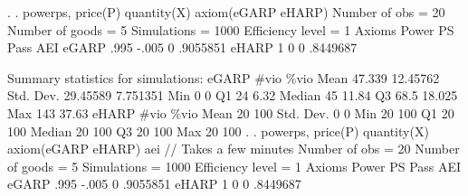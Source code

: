 . 
. powerps, price(P) quantity(X) axiom(eGARP eHARP)
{\smallskip}
                       Number of obs           =        20 
                       Number of goods         =         5 
                       Simulations             =      1000 
                       Efficiency level        =         1 
{\smallskip}
      Axioms {\VBAR}     Power         PS       Pass        AEI 
       eGARP {\VBAR}      .995      -.005          0   .9055851 
       eHARP {\VBAR}         1          0          0   .8449687 
 
Summary statistics for simulations:
{\smallskip}
       eGARP {\VBAR}      \#vio       \%vio 
        Mean {\VBAR}    47.339   12.45762 
   Std. Dev. {\VBAR}  29.45589   7.751351 
         Min {\VBAR}         0          0 
          Q1 {\VBAR}        24       6.32 
      Median {\VBAR}        45      11.84 
          Q3 {\VBAR}      68.5     18.025 
         Max {\VBAR}       143      37.63 
{\smallskip}
       eHARP {\VBAR}      \#vio       \%vio 
        Mean {\VBAR}        20        100 
   Std. Dev. {\VBAR}         0          0 
         Min {\VBAR}        20        100 
          Q1 {\VBAR}        20        100 
      Median {\VBAR}        20        100 
          Q3 {\VBAR}        20        100 
         Max {\VBAR}        20        100 
{\smallskip}
. 
. powerps, price(P) quantity(X) axiom(eGARP eHARP) aei    // Takes a few minutes
{\smallskip}
                       Number of obs           =        20 
                       Number of goods         =         5 
                       Simulations             =      1000 
                       Efficiency level        =         1 
{\smallskip}
      Axioms {\VBAR}     Power         PS       Pass        AEI 
       eGARP {\VBAR}      .995      -.005          0   .9055851 
       eHARP {\VBAR}         1          0          0   .8449687 
 
